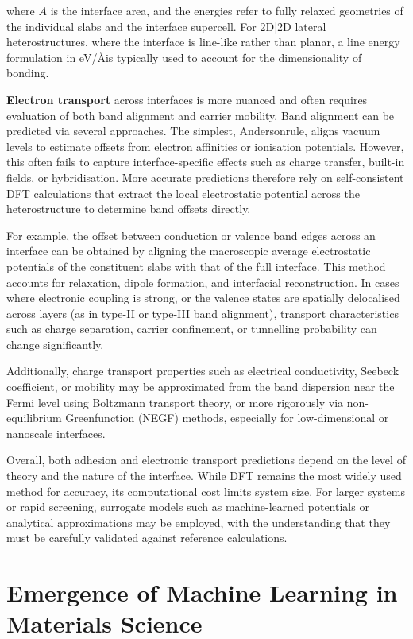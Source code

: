 where $A$ is the interface area, and the energies refer to fully relaxed geometries of the individual slabs and the interface supercell. For 2D|2D lateral heterostructures, where the interface is line-like rather than planar, a line energy formulation in eV/\AA is typically used to account for the dimensionality of bonding.

\textbf{Electron transport} across interfaces is more nuanced and often requires evaluation of both band alignment and carrier mobility. Band alignment can be predicted via several approaches. The simplest, Anderson\rqss rule, aligns vacuum levels to estimate offsets from electron affinities or ionisation potentials. However, this often fails to capture interface-specific effects such as charge transfer, built-in fields, or hybridisation. More accurate predictions therefore rely on self-consistent DFT calculations that extract the local electrostatic potential across the heterostructure to determine band offsets directly.

For example, the offset between conduction or valence band edges across an interface can be obtained by aligning the macroscopic average electrostatic potentials of the constituent slabs with that of the full interface. This method accounts for relaxation, dipole formation, and interfacial reconstruction. In cases where electronic coupling is strong, or the valence states are spatially delocalised across layers (as in type-II or type-III band alignment), transport characteristics such as charge separation, carrier confinement, or tunnelling probability can change significantly.

Additionally, charge transport properties such as electrical conductivity, Seebeck coefficient, or mobility may be approximated from the band dispersion near the Fermi level using Boltzmann transport theory, or more rigorously via non-equilibrium Green\rqss function (NEGF) methods, especially for low-dimensional or nanoscale interfaces.

Overall, both adhesion and electronic transport predictions depend on the level of theory and the nature of the interface. While DFT remains the most widely used method for accuracy, its computational cost limits system size. For larger systems or rapid screening, surrogate models such as machine-learned potentials or analytical approximations may be employed, with the understanding that they must be carefully validated against reference calculations.

\section{Emergence of Machine Learning in Materials Science} \label{section:machine_learning}

